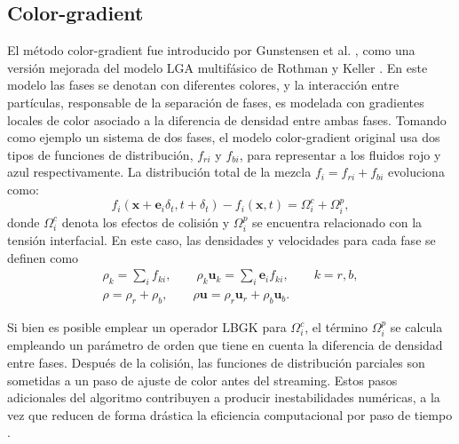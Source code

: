 \subsection*{Color-gradient}
El m\'etodo color-gradient fue introducido por Gunstensen et al. \cite{gunstensen_lattice_1991}, como una versi\'on mejorada del modelo LGA multif\'asico de Rothman y Keller \cite{rothman_immiscible_1988}. En este modelo las fases se denotan con diferentes colores, y la interacci\'on entre part\'iculas, responsable de la separaci\'on de fases, es modelada con gradientes locales de color asociado a la diferencia de densidad entre ambas fases. Tomando como ejemplo un sistema de dos fases, el modelo color-gradient original usa dos tipos de funciones de distribuci\'on, $f_{ri}$ y $f_{bi}$, para representar a los fluidos rojo y azul respectivamente. La distribuci\'on total de la mezcla $f_i = f_{ri}+f_{bi}$ evoluciona como:
\begin{equation}
	f_i(\bm{x}+\bm{e}_i\delta_t,t+\delta_t) - f_i(\bm{x},t) = \Omega_i^c + \Omega_i^p,
\end{equation}
donde $\Omega_i^c$ denota los efectos de colisi\'on y $\Omega_i^p$ se encuentra relacionado con la tensi\'on interfacial. En este caso, las densidades y velocidades para cada fase se definen como
\begin{equation}
	\begin{gathered}
	\rho_k = \sum_i f_{ki}, \qquad \rho_k\bm{u}_k = \sum_i \bm{e}_if_{ki}, \qquad k=r,b, \\
	\rho = \rho_r + \rho_b, \qquad \rho\bm{u} = \rho_r\bm{u}_r + \rho_b\bm{u}_b.
	\end{gathered}
\end{equation}

Si bien es posible emplear un operador LBGK para $\Omega_i^c$, el t\'ermino $\Omega_i^p$ se calcula empleando un par\'ametro de orden que tiene en cuenta la diferencia de densidad entre fases. Despu\'es de la colisi\'on, las funciones de distribuci\'on parciales son sometidas a un paso de ajuste de color antes del streaming. Estos pasos adicionales del algoritmo contribuyen a producir inestabilidades num\'ericas, a la vez que reducen de forma dr\'astica la eficiencia computacional por paso de tiempo \cite{guo_lattice_2013}.


